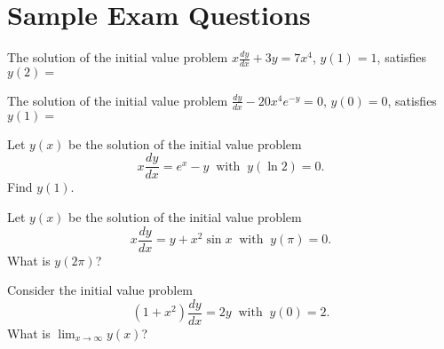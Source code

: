 \documentclass{ximera}
\begin{document}
\section*{Sample Exam Questions}

\begin{question}%

The solution of the initial value problem \(\displaystyle x \frac{dy}{dx} + 3y = 7 x^4\),  \(y(1) = 1\),
satisfies \(y(2) = \)
\begin{multiplechoice}
\end{multiplechoice}

\end{question}

\begin{question}%

The solution of the initial value problem \(\displaystyle \frac{dy}{dx} - 20 x^4 e^{-y} = 0\),  \(y(0) = 0\),
satisfies \(y(1) = \)
\begin{multiplechoice}
\end{multiplechoice}

\end{question}

\begin{question}%

Let \(y(x)\) be the solution of the initial value problem
\[ x \frac{dy}{dx} = e^x - y \ \text{ with } \ y(\ln 2) = 0. \]
Find \(y(1)\).
\begin{multiplechoice}
\end{multiplechoice}

\end{question}

\begin{question}%

Let \(y(x)\) be the solution of the initial value problem
\[ x \frac{dy}{dx} = y + x^2 \sin x \ \text{ with } \ y (\pi) = 0. \]
What is \(y(2 \pi)\)?
\begin{multiplechoice}
\choice{\(-\pi\)}
\choice{\(-2\pi\)}
\choice[correct]{\(-4\pi\)}
\choice{\(2\pi\)}
\choice{\(4\pi\)}
\end{multiplechoice}

\end{question}

\begin{question}%

Consider the initial value problem
\[ (1 + x^2) \frac{dy}{dx} = 2y \ \text{ with } \ y(0) = 2. \]
What is \(\displaystyle \lim_{x \rightarrow \infty} y(x)\)?
\begin{multiplechoice}
\end{multiplechoice}

\end{question}
\end{document}
